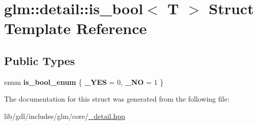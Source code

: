 \hypertarget{structglm_1_1detail_1_1is__bool}{}\section{glm\+:\+:detail\+:\+:is\+\_\+bool$<$ T $>$ Struct Template Reference}
\label{structglm_1_1detail_1_1is__bool}
\subsection*{Public Types}
\begin{DoxyCompactItemize}
\item 
\hypertarget{structglm_1_1detail_1_1is__bool_aa5ed0c84d7bb25b9c2a0ad2926bbb1f1}{}enum {\bfseries is\+\_\+bool\+\_\+enum} \{ {\bfseries \+\_\+\+Y\+E\+S} = 0, 
{\bfseries \+\_\+\+N\+O} = 1
 \}\label{structglm_1_1detail_1_1is__bool_aa5ed0c84d7bb25b9c2a0ad2926bbb1f1}

\end{DoxyCompactItemize}


The documentation for this struct was generated from the following file\+:\begin{DoxyCompactItemize}
\item 
lib/gdl/includes/glm/core/\hyperlink{__detail_8hpp}{\+\_\+detail.\+hpp}\end{DoxyCompactItemize}
